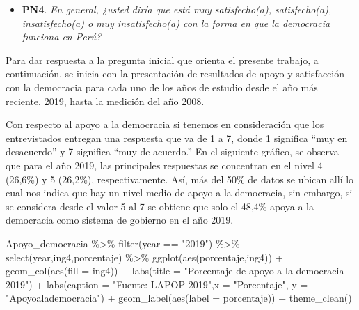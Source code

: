\documentclass[
]{book}
\newenvironment{Shaded}{\begin{snugshade}}{\end{snugshade}}
\newcommand{\AttributeTok}[1]{\textcolor[rgb]{0.77,0.63,0.00}{#1}}
\newcommand{\FunctionTok}[1]{\textcolor[rgb]{0.00,0.00,0.00}{#1}}
\newcommand{\NormalTok}[1]{#1}
\newcommand{\SpecialCharTok}[1]{\textcolor[rgb]{0.00,0.00,0.00}{#1}}
\newcommand{\StringTok}[1]{\textcolor[rgb]{0.31,0.60,0.02}{#1}}
\providecommand{\tightlist}{%
  \setlength{\itemsep}{0pt}\setlength{\parskip}{0pt}}
\begin{document}
\begin{itemize}
\tightlist
\item
  \textbf{PN4}. \emph{En general, ¿usted diría que está muy satisfecho(a), satisfecho(a), insatisfecho(a) o muy insatisfecho(a) con la forma en que la democracia funciona en Perú?}
\end{itemize}

Para dar respuesta a la pregunta inicial que orienta el presente trabajo, a continuación, se inicia con la presentación de resultados de apoyo y satisfacción con la democracia para cada uno de los años de estudio desde el año más reciente, 2019, hasta la medición del año 2008.

Con respecto al apoyo a la democracia si tenemos en consideración que los entrevistados entregan una respuesta que va de 1 a 7, donde 1 significa ``muy en desacuerdo'' y 7 significa ``muy de acuerdo.'' En el siguiente gráfico, se observa que para el año 2019, las principales respuestas se concentran en el nivel 4 (26,6\%) y 5 (26,2\%), respectivamente. Así, más del 50\% de datos se ubican allí lo cual nos indica que hay un nivel medio de apoyo a la democracia, sin embargo, si se considera desde el valor 5 al 7 se obtiene que solo el 48,4\% apoya a la democracia como sistema de gobierno en el año 2019.

\begin{Shaded}
\begin{Highlighting}[]
\NormalTok{Apoyo\_democracia }\SpecialCharTok{\%\textgreater{}\%}
  \FunctionTok{filter}\NormalTok{(year }\SpecialCharTok{==} \StringTok{"2019"}\NormalTok{) }\SpecialCharTok{\%\textgreater{}\%}
  \FunctionTok{select}\NormalTok{(year,ing4,porcentaje) }\SpecialCharTok{\%\textgreater{}\%}
  \FunctionTok{ggplot}\NormalTok{(}\FunctionTok{aes}\NormalTok{(porcentaje,ing4)) }\SpecialCharTok{+} 
  \FunctionTok{geom\_col}\NormalTok{(}\FunctionTok{aes}\NormalTok{(}\AttributeTok{fill =}\NormalTok{ ing4)) }\SpecialCharTok{+}
  \FunctionTok{labs}\NormalTok{(}\AttributeTok{title =} \StringTok{"Porcentaje de apoyo a la democracia 2019"}\NormalTok{) }\SpecialCharTok{+}
  \FunctionTok{labs}\NormalTok{(}\AttributeTok{caption =} \StringTok{"Fuente: LAPOP 2019"}\NormalTok{,}\AttributeTok{x =} \StringTok{"Porcentaje"}\NormalTok{, }\AttributeTok{y =} \StringTok{"Apoyoalademocracia"}\NormalTok{) }\SpecialCharTok{+}
  \FunctionTok{geom\_label}\NormalTok{(}\FunctionTok{aes}\NormalTok{(}\AttributeTok{label =}\NormalTok{ porcentaje)) }\SpecialCharTok{+}
  \FunctionTok{theme\_clean}\NormalTok{()}
\end{Highlighting}
\end{Shaded}
\end{document}
